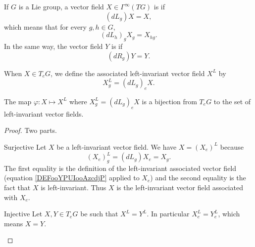 \begin{definition}
    If $G$ is a Lie group, a vector field $X\in\Gamma^{\infty}(TG)$ is  if
    \begin{equation}
        (dL_g) X= X,
    \end{equation}
    which means that for every \( g,h\in G\),
    \begin{equation}
        (dL_h)_gX_g=X_{hg}.
    \end{equation}
    In the same way, the vector field \( Y\) is  if
    \begin{equation}
        (dR_g)Y=Y.
    \end{equation}
\end{definition}

When \( X\in T_eG\), we define the associated left-invariant vector field \( X^L\) by
\begin{equation}        \label{DEFooYPUIooAzcdjP}
    X^L_g=(dL_g)_eX.
\end{equation}

\begin{theorem}
	The map \( \varphi\colon X\mapsto X^L\) where \( X^L_g=(dL_g)_eX\) is a bijection from \( T_eG\) to the set of left-invariant vector fields.
\end{theorem}

\begin{proof}
    Two parts.
    \begin{subproof}
        \item[Surjective]
            Let \( X\) be a left-invariant vector field. We have \( X=(X_e)^L\) because
            \begin{equation}
                (X_e)^L_g=(dL_g)X_e=X_g.
            \end{equation}
            The first equality is the definition of the left-invariant associated vector field (equation \eqref{DEFooYPUIooAzcdjP} applied to \( X_e\)) and the second equality is the fact that \( X\) is left-invariant. Thus \( X\) is the left-invariant vector field associated with \( X_e\).
        \item[Injective]
            Let \( X,Y\in T_eG\) be such that \( X^L=Y^L\). In particular \( X^L_e=Y^L_e\), which means \( X=Y\).
    \end{subproof}
\end{proof}

